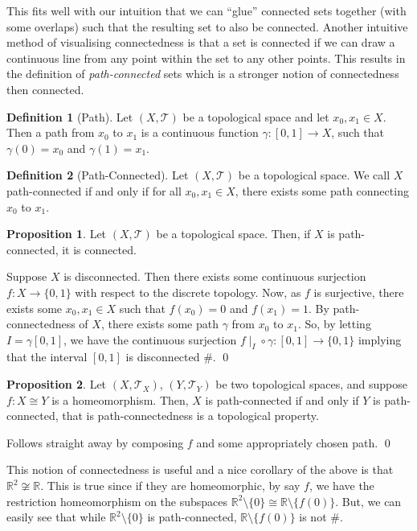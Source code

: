 \documentclass[
]{article}
\theoremstyle{definition}
\newtheorem{prop}{Proposition}
\theoremstyle{definition}
\newtheorem{definition}{Definition}[section]
\begin{document}
This fits well with our intuition that we can ``glue'' connected sets
together (with some overlaps) such that the resulting set to also be
connected. Another intuitive method of visualising connectedness is that
a set is connected if we can draw a continuous line from any point
within the set to any other points. This results in the definition of
\emph{path-connected} sets which is a stronger notion of connectedness
then connected.

\begin{definition}[Path]
  Let \((X, \mathcal{T})\) be a topological space and let \(x_0, x_1 \in X\). 
  Then a path from \(x_0\) to \(x_1\) is a continuous function 
  \(\gamma : [0, 1] \to X\), such that \(\gamma (0) = x_0\) and \(\gamma (1) = x_1\).
\end{definition}

\begin{definition}[Path-Connected]
  Let \((X, \mathcal{T})\) be a topological space. We call \(X\) path-connected 
  if and only if for all \(x_0, x_1 \in X\), there exists some path connecting 
  \(x_0\) to \(x_1\).
\end{definition}

\begin{prop}
  Let \((X, \mathcal{T})\) be a topological space. Then, if \(X\) is path-connected, 
  it is connected.
\end{prop}
\proof

Suppose \(X\) is disconnected. Then there exists some continuous
surjection \(f : X \to \{0, 1\}\) with respect to the discrete topology.
Now, as \(f\) is surjective, there exists some \(x_0, x_1 \in X\) such
that \(f(x_0) = 0\) and \(f(x_1) = 1\). By path-connectedness of \(X\),
there exists some path \(\gamma\) from \(x_0\) to \(x_1\). So, by
letting \(I = \gamma[0, 1]\), we have the continuous surjection
\(f \mid_I \circ \gamma : [0, 1] \to \{0, 1\}\) implying that the
interval \([0, 1]\) is disconnected \#. \qed

\begin{prop}
  Let \((X, \mathcal{T}_X)\), \((Y, \mathcal{T}_Y)\) be two topological spaces, 
  and suppose \(f : X \cong Y\) is a homeomorphism. Then, \(X\) is path-connected 
  if and only if \(Y\) is path-connected, that is path-connectedness is a 
  topological property.
\end{prop}
\proof

Follows straight away by composing \(f\) and some appropriately chosen
path. \qed

This notion of connectedness is useful and a nice corollary of the above
is that \(\mathbb{R}^2 \not\cong \mathbb{R}\). This is true since if
they are homeomorphic, by say \(f\), we have the restriction
homeomorphism on the subspaces
\(\mathbb{R}^2 \setminus \{0\} \cong \mathbb{R} \setminus \{f(0)\}\).
But, we can easily see that while \(\mathbb{R}^2 \setminus \{0\}\) is
path-connected, \(\mathbb{R} \setminus \{f(0)\}\) is not \#.
\end{document}
